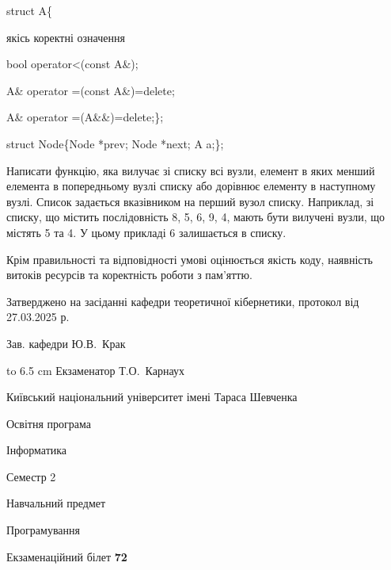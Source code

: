 \documentclass[12pt, ukrainian]{article}
\begin{document}
{struct A\{

\quad  якісь коректні означення 

\quad  bool operator<(const A\&); 

\quad A\& operator =(const A\&)=delete; 

\quad  A\& operator =(A\&\&)=delete;\};

struct Node\{Node *prev; Node *next; A a;\};

Написати функцію, яка вилучає зі списку всі вузли, елемент в яких менший елемента в попередньому вузлі списку або дорівнює елементу в наступному вузлі. Список задається вказівником на перший вузол списку. Наприклад, зі списку, що містить послідовність 8, 5, 6, 9, 4, мають бути вилучені вузли, що містять 5 та 4. У цьому прикладі 6 залишається в списку.

Крім правильності та відповідності умові оцінюється якість коду, наявність витоків ресурсів та коректність роботи з пам'яттю. 

}
{\smallskip\smallskip \begin {scriptsize} Затверджено на засіданні кафедри теоретичної кібернетики, протокол   від   27.03.2025 р.\par\smallskip\smallskip\smallskip\smallskip
{\parbox {6.5 cm} {Зав. кафедри \dotfill Ю.В.~Крак}}\hspace {0.7cm} {\hbox to 6.5 cm { Екзаменатор \dotfill Т.О.~Карнаух}} \end{scriptsize}}
\newpage
{{\begin {scriptsize}\par
{ \center  Київський національний університет імені Тараса Шевченка \par}
{\parbox {5 cm}{Освітня програма \hfill}{\parbox {7 cm}{Інформатика\hfill}}\parbox {6 cm}{\hfill Семестр 2}}\par
{\parbox {5 cm} {Навчальний предмет \hfill}\parbox {7 cm}{Програмування \hfill}\parbox {6cm}{\hfill}\par}\vspace{-15pt} \end{scriptsize}}{\center Екзаменаційний білет \No \textbf { 72 }\par}}
\end{document}
